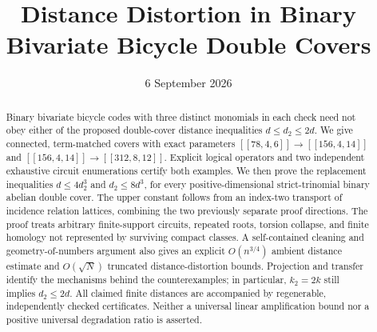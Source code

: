 \documentclass[11pt]{article}
\title{Distance Distortion in Binary Bivariate Bicycle Double Covers}
\author{\paperauthors}
\date{6 September 2026}
\theoremstyle{definition}\newtheorem{definition}[theorem]{Definition}
\theoremstyle{remark}\newtheorem{remark}[theorem]{Remark}
\newcommand{\Qcode}[3]{[[#1,#2,#3]]}
\begin{document}
\maketitle
\begin{abstract}
Binary bivariate bicycle codes with three distinct monomials in each check need not obey either of the proposed double-cover distance inequalities $d\le d_2\le2d$. We give connected, term-matched covers with exact parameters $\Qcode{78}{4}{6}\to\Qcode{156}{4}{14}$ and $\Qcode{156}{4}{14}\to\Qcode{312}{8}{12}$. Explicit logical operators and two independent exhaustive circuit enumerations certify both examples. We then prove the replacement inequalities $d\le4d_2^3$ and $d_2\le8d^3$, for every positive-dimensional strict-trinomial binary abelian double cover. The upper constant follows from an index-two transport of incidence relation lattices, combining the two previously separate proof directions. The proof treats arbitrary finite-support circuits, repeated roots, torsion collapse, and finite homology not represented by surviving compact classes. A self-contained cleaning and geometry-of-numbers argument also gives an explicit $O(n^{3/4})$ ambient distance estimate and $O(\sqrt N)$ truncated distance-distortion bounds. Projection and transfer identify the mechanisms behind the counterexamples; in particular, $k_2=2k$ still implies $d_2\le2d$. All claimed finite distances are accompanied by regenerable, independently checked certificates. Neither a universal linear amplification bound nor a positive universal degradation ratio is asserted.
\end{abstract}
\tableofcontents





\appendix



\end{document}
